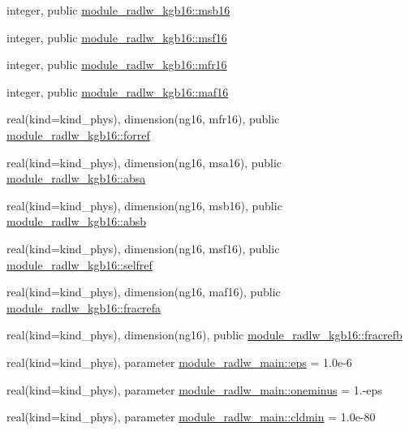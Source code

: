 \begin{DoxyCompactItemize}
\item 
integer, public \hyperlink{group__module__radlw__main_ga18ad5b461d6c71b1aa2d82d5694beb03}{module\+\_\+radlw\+\_\+kgb16\+::msb16}
\item 
integer, public \hyperlink{group__module__radlw__main_ga8601911604c1d6a1b32e434159ae95d2}{module\+\_\+radlw\+\_\+kgb16\+::msf16}
\item 
integer, public \hyperlink{group__module__radlw__main_ga82777667b951207c62955e3e1492d79d}{module\+\_\+radlw\+\_\+kgb16\+::mfr16}
\item 
integer, public \hyperlink{group__module__radlw__main_gaae4c96f4a2ae49c573189f2d63ccd4a3}{module\+\_\+radlw\+\_\+kgb16\+::maf16}
\item 
real(kind=kind\+\_\+phys), dimension(ng16, mfr16), public \hyperlink{group__module__radlw__main_ga4402ed68e18459813a6c9ede5d6ba9cc}{module\+\_\+radlw\+\_\+kgb16\+::forref}
\item 
real(kind=kind\+\_\+phys), dimension(ng16, msa16), public \hyperlink{group__module__radlw__main_ga2734b420b7e8e8393a8bf1b595a3cf09}{module\+\_\+radlw\+\_\+kgb16\+::absa}
\item 
real(kind=kind\+\_\+phys), dimension(ng16, msb16), public \hyperlink{group__module__radlw__main_gae856b42252b71d4d588ea5e19e871cac}{module\+\_\+radlw\+\_\+kgb16\+::absb}
\item 
real(kind=kind\+\_\+phys), dimension(ng16, msf16), public \hyperlink{group__module__radlw__main_gafaa2554e1161bd6c983ce630d39d703a}{module\+\_\+radlw\+\_\+kgb16\+::selfref}
\item 
real(kind=kind\+\_\+phys), dimension(ng16, maf16), public \hyperlink{group__module__radlw__main_ga355dcc9f6f4955ab3d7ee0a22005c8ba}{module\+\_\+radlw\+\_\+kgb16\+::fracrefa}
\item 
real(kind=kind\+\_\+phys), dimension(ng16), public \hyperlink{group__module__radlw__main_gab93affafac8e2bb182982133a6449de4}{module\+\_\+radlw\+\_\+kgb16\+::fracrefb}
\item 
real(kind=kind\+\_\+phys), parameter \hyperlink{group__module__radlw__main_gac82309fd8d0e351ac37b276833a10376}{module\+\_\+radlw\+\_\+main\+::eps} = 1.\+0e-\/6
\item 
real(kind=kind\+\_\+phys), parameter \hyperlink{group__module__radlw__main_ga8c35a92c2a08663ce04bdf9de8717247}{module\+\_\+radlw\+\_\+main\+::oneminus} = 1.-\/eps
\item 
real(kind=kind\+\_\+phys), parameter \hyperlink{group__module__radlw__main_gac55ad4a1ff397794e054be6647bafb73}{module\+\_\+radlw\+\_\+main\+::cldmin} = 1.\+0e-\/80

\end{DoxyCompactItemize}
